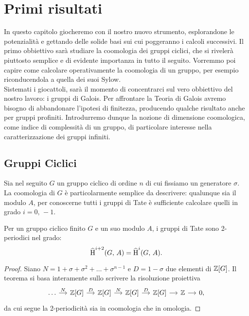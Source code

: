 \chapter{Primi risultati}
In questo capitolo giocheremo con il nostro nuovo strumento, esplorandone le potenzialità e gettando delle solide basi sui cui poggeranno i calcoli successivi. Il primo obbiettivo sarà studiare la coomologia dei gruppi ciclici, che si rivelerà piuttosto semplice e di evidente importanza in tutto il seguito. Vorremmo poi capire come calcolare operativamente la coomologia di un gruppo, per esempio riconducendola a quella dei suoi Sylow. \\

Sistemati i giocattoli, sarà il momento di concentrarci sul vero obbiettivo del nostro lavoro: i gruppi di Galois. Per affrontare la Teoria di Galois avremo bisogno di abbandonare l'ipotesi di finitezza, producendo qualche risultato anche per gruppi profiniti. Introdurremo dunque la nozione di dimensione coomologica, come indice di complessità di un gruppo, di particolare interesse nella caratterizzazione dei gruppi infiniti.

\section{Gruppi Ciclici}
Sia nel seguito $ G $ un gruppo ciclico di ordine $ n $ di cui fissiamo un generatore $ \sigma $. La coomologia di $ G $ è particolarmente semplice da descrivere: qualunque sia il modulo $ A $, per conoscerne tutti i gruppi di Tate è sufficiente calcolare quelli in grado $ i = 0, \, -1 $.

\begin{theorem}\label{ciclici}
	Per un gruppo ciclico finito $ G $ e un suo modulo $ A $, i gruppi di Tate sono 2-periodici nel grado:
	\[ \operatorname{\widehat{H}}^{i+2}(G, \, A) = \operatorname{\widehat{H}}^{i}(G, \, A). \]
\end{theorem}

\begin{proof}
	Siano $ N = 1 + \sigma + \sigma^2 + \dots + \sigma^{n-1} $ e $ D = 1 - \sigma $ due elementi di $ \mathbb{Z}[G] $. Il teorema si basa interamente sullo scrivere la risoluzione proiettiva
	\[ \begin{tikzcd}[column sep = small]
	\dots \rar["N"]
	& \Z[G] \rar["D"]
	& \Z[G] \rar["N"]
	& \Z[G] \rar["D"]
	& \Z[G] \rar
	& \Z \rar & 0,
	\end{tikzcd} \]
	da cui segue la 2-periodicità sia in coomologia che in omologia. 
	
\end{proof}

